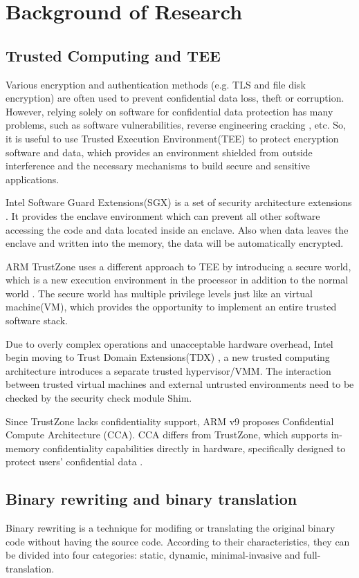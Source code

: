 \section{Background of Research}
\subsection{Trusted Computing and TEE}
Various encryption and authentication methods (e.g. TLS and file disk encryption)
are often used to prevent confidential data loss, theft or corruption.
However, relying solely on software for confidential data protection has many problems,
such as software vulnerabilities, reverse engineering cracking \cite{Zimba2021ARC}, etc.
So, it is useful to use Trusted Execution Environment(TEE) to protect encryption software
and data, which provides an environment shielded from outside interference and the necessary mechanisms to build secure and sensitive applications.

Intel Software Guard Extensions(SGX) is a set of security architecture extensions 
\cite{McKeen2013InnovativeIA}.
It provides the enclave environment which can prevent all other software accessing the code
and data located inside an enclave. Also when data leaves the enclave and written into
the memory, the data will be automatically encrypted.

ARM TrustZone uses a different approach to TEE by introducing a secure world,
which is a new execution environment in the processor in addition to the normal world
\cite{Mukhtar2019ArchitecturesFS}. The secure world has multiple privilege levels just
like an virtual machine(VM), which provides the opportunity to implement an entire
trusted software stack.

Due to overly complex operations and unacceptable hardware overhead, Intel begin moving to
Trust Domain Extensions(TDX) \cite{Sahita2021SecurityAO, Sardar2021DemystifyingAI}, a new
trusted computing architecture introduces a separate trusted hypervisor/VMM. The interaction
between trusted virtual machines and external untrusted environments need to be checked by the
security check module Shim.

Since TrustZone lacks confidentiality support, ARM v9 proposes Confidential Compute Architecture (CCA).
CCA differs from TrustZone, which supports in-memory confidentiality capabilities directly in hardware,
specifically designed to protect users' confidential data \cite{CCA}.

\subsection{Binary rewriting and binary translation}
Binary rewriting is a technique for modifing or translating the original binary code
without having the source code. According to their characteristics, they can be divided
into four categories: static, dynamic, minimal-invasive and full-translation.


